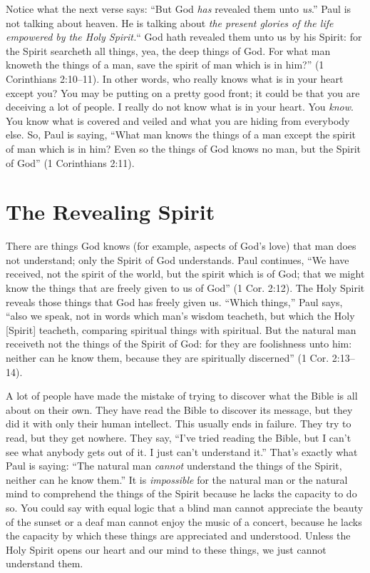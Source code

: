 Notice what the next verse says: “But God \emph{has} revealed 
them unto \emph{us}.” Paul is not talking about heaven. 
He is talking about \emph{the present glories of the life empowered by the Holy Spirit.}“
God hath revealed them unto us by his Spirit: for 
the Spirit searcheth all things, yea, the deep things of God. 
For what man knoweth the things of a man, save the spirit 
of man which is in him?” (1 Corinthians 2:10–11). In other 
words, who really knows what is in your heart except you? 
You may be putting on a pretty good front; it could be that 
you are deceiving a lot of people. I really do not know 
what is in your heart. You \emph{know}. You know what is covered 
and veiled and what you are hiding from everybody else. 
So, Paul is saying, “What man knows the things of a man 
except the spirit of man which is in him? Even so the things 
of God knows no man, but the Spirit of God” (1 Corinthians 
2:11).


\section*{The Revealing Spirit}

There are things God knows (for example, aspects of 
God’s love) that man does not understand; only the Spirit 
of God understands. Paul continues, “We have received, not 
the spirit of the world, but the spirit which is of God; that 
we might know the things that are freely given to us of 
God” (1 Cor. 2:12). The Holy Spirit reveals those things that 
God has freely given us. “Which things,” Paul says, “also 
we speak, not in words which man’s wisdom teacheth, but 
which the Holy [Spirit] teacheth, comparing spiritual things 
with spiritual. But the natural man receiveth not the things 
of the Spirit of God: for they are foolishness unto him: neither can he know them, because they are spiritually discerned” (1 Cor. 2:13–14).

A lot of people have made the mistake of trying to discover what the Bible is all about on their own. They have 
read the Bible to discover its message, but they did it with 
only their human intellect. This usually ends in failure. They 
try to read, but they get nowhere. They say, “I’ve tried reading the Bible, but I can’t see what anybody gets out of it. I 
just can’t understand it.” That’s exactly what Paul is saying: 
“The natural man \emph{cannot} understand the things of the Spirit, 
neither can he know them.” It is \emph{impossible} for the natural 
man or the natural mind to comprehend the things of the 
Spirit because he lacks the capacity to do so. You could 
say with equal logic that a blind man cannot appreciate the 
beauty of the sunset or a deaf man cannot enjoy the music 
of a concert, because he lacks the capacity by which these 
things are appreciated and understood. Unless the Holy 
Spirit opens our heart and our mind to these things, we just 
cannot understand them.


